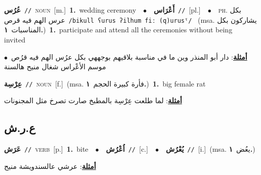 \documentclass[10pt,a4paper,twoside]{article} %
\begin{document}
\begin{multicols}{2}
{\setlength\topsep{0pt}\textbf{\foreignlanguage{arabic}{عُرُس}}\ {\color{gray}\texttt{//}\color{black}}\ \textsc{noun}\ [m.]\ \textbf{1.}~wedding ceremony\ \ $\bullet$\ \ \setlength\topsep{0pt}\textbf{\foreignlanguage{arabic}{أَعْرَاس}}\ {\color{gray}\texttt{//}\color{black}}\ [pl.]\ \ $\bullet$\ \ \textsc{ph.} \color{gray} \foreignlanguage{arabic}{بكل عرس الهم فيه قرص}\color{black}\ {\color{gray}\texttt{/{\sffamily bikull ʕurus ʔilhum fiː (q)urusˤ}/}\color{black}}\ \color{gray} (msa. \foreignlanguage{arabic}{يشاركون بكل المناسبات}~\foreignlanguage{arabic}{\textbf{١.}})\color{black}\ \textbf{1.}~participate and attend all the ceremonies without being invited\  \begin{flushright}\color{gray}\foreignlanguage{arabic}{\textbf{\underline{\foreignlanguage{arabic}{أمثلة}}}: دار أبو المنذر وين ما في مناسبة بلاقيهم بوجههي بكل عرُس الهم فيه قرُص\ $\bullet$\ \  موسم الأعْراس شغال منيح هالسنة}\end{flushright}\color{black}} \vspace{2mm}

{\setlength\topsep{0pt}\textbf{\foreignlanguage{arabic}{عِرْسِة}}\ {\color{gray}\texttt{//}\color{black}}\ \textsc{noun}\ [f.]\ \color{gray}(msa. \foreignlanguage{arabic}{فأرة كبيرة الحجم}~\foreignlanguage{arabic}{\textbf{١.}})\color{black}\ \textbf{1.}~big female rat\  \begin{flushright}\color{gray}\foreignlanguage{arabic}{\textbf{\underline{\foreignlanguage{arabic}{أمثلة}}}: لما طلعت عِرْسِة بالمطبخ صارت تصرخ مثل المجنونات}\end{flushright}\color{black}} \vspace{2mm}

\vspace{-3mm}
\subsection*{\color{blue}\foreignlanguage{arabic}{ع.ر.ش}\color{blue}{}} 

{\setlength\topsep{0pt}\textbf{\foreignlanguage{arabic}{عَرَش}}\ {\color{gray}\texttt{//}\color{black}}\ \textsc{verb}\ [p.]\ \textbf{1.}~bite\ \ $\bullet$\ \ \setlength\topsep{0pt}\textbf{\foreignlanguage{arabic}{اُعْرُش}}\ {\color{gray}\texttt{//}\color{black}}\ [c.]\ \ $\bullet$\ \ \setlength\topsep{0pt}\textbf{\foreignlanguage{arabic}{يُعْرُش}}\ {\color{gray}\texttt{//}\color{black}}\ [i.]\ \color{gray}(msa. \foreignlanguage{arabic}{يعُض}~\foreignlanguage{arabic}{\textbf{١.}})\color{black}\  \begin{flushright}\color{gray}\foreignlanguage{arabic}{\textbf{\underline{\foreignlanguage{arabic}{أمثلة}}}: عرشي عالسندويشة منيح}\end{flushright}\color{black}} \vspace{2mm}


\end{multicols}
\end{document}
